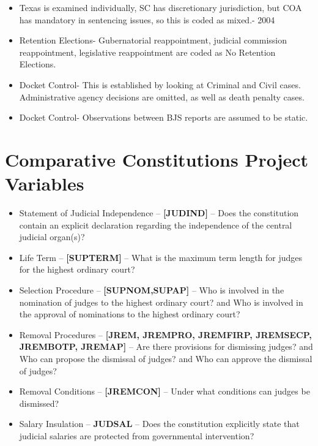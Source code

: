\documentclass[12pt]{article}
\begin{document}
\begin{itemize}
	\item Texas is examined individually, SC has discretionary jurisdiction, but COA has mandatory in sentencing issues, so this is coded as mixed.- 2004
	
	\item Retention Elections- Gubernatorial reappointment, judicial commission reappointment, legislative reappointment are coded as No Retention Elections.
	
	\item Docket Control- This is established by looking at Criminal and Civil cases.  Administrative agency decisions are omitted, as well as death penalty cases.
	
	\item Docket Control- Observations between BJS reports are assumed to be static.
\end{itemize}	

\section{Comparative Constitutions Project Variables}\label{CCPCode}
\begin{itemize}
	\item Statement of Judicial Independence -- \textbf{[JUDIND]} -- Does the constitution contain an explicit declaration regarding the independence of the central judicial organ(s)? 
	\item Life Term -- \textbf{[SUPTERM]} -- What is the maximum term length for judges for the highest ordinary court? 
	\item Selection Procedure -- \textbf{[SUPNOM,SUPAP]} -- Who is involved in the nomination of judges to the highest ordinary court? and Who is involved in the approval of nominations to the highest ordinary court? 
	\item Removal Procedures -- \textbf{[JREM, JREMPRO, JREMFIRP, JREMSECP, JREMBOTP, JREMAP]} -- Are there provisions for dismissing judges? and Who can propose the dismissal of judges? and Who can approve the dismissal of judges?
	\item Removal Conditions -- \textbf{[JREMCON]} -- Under what conditions can judges be dismissed?
	\item Salary Insulation -- \textbf{JUDSAL} -- Does the constitution explicitly state that judicial salaries are protected from governmental intervention?
\end{itemize}
\end{document}

